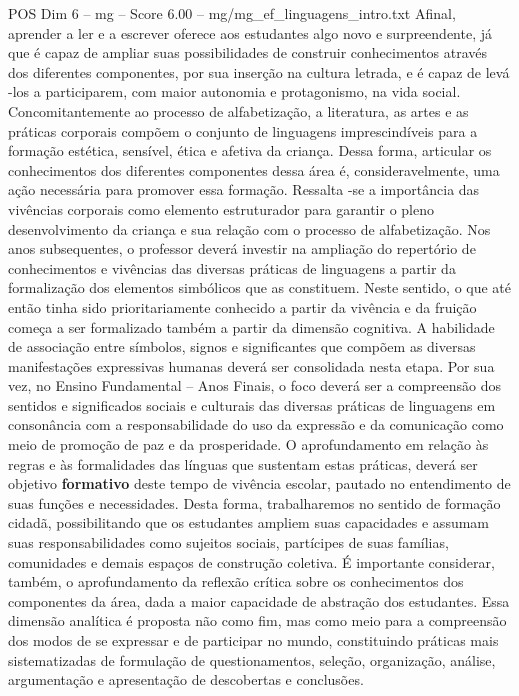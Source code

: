 \begin{textsample}{POS Dim 6 – mg – Score 6.00 – mg/mg\_ef\_linguagens\_intro.txt}
Afinal, aprender a ler e a escrever oferece aos estudantes algo novo e surpreendente, já que é capaz de ampliar suas possibilidades de construir conhecimentos através dos diferentes componentes, por sua inserção na cultura letrada, e é capaz de levá -los a participarem, com maior autonomia e protagonismo, na vida social.
Concomitantemente ao processo de alfabetização, a literatura, as artes e as práticas corporais compõem o conjunto de linguagens imprescindíveis para a formação estética, sensível, ética e afetiva da criança.
Dessa forma, articular os conhecimentos dos diferentes componentes dessa área é, consideravelmente, uma ação necessária para promover essa formação.
Ressalta -se a importância das vivências corporais como elemento estruturador para garantir o pleno desenvolvimento da criança e sua relação com o processo de alfabetização.
Nos anos subsequentes, o professor deverá investir na ampliação do repertório de conhecimentos e vivências das diversas práticas de linguagens a partir da formalização dos elementos simbólicos que as constituem.
Neste sentido, o que até então tinha sido prioritariamente conhecido a partir da vivência e da fruição começa a ser formalizado também a partir da dimensão cognitiva.
A habilidade de associação entre símbolos, signos e significantes que compõem as diversas manifestações expressivas humanas deverá ser consolidada nesta etapa.
Por sua vez, no Ensino Fundamental – Anos Finais, o foco deverá ser a compreensão dos sentidos e significados sociais e culturais das diversas práticas de linguagens em consonância com a responsabilidade do uso da expressão e da comunicação como meio de promoção de paz e da prosperidade.
O aprofundamento em relação às regras e às formalidades das línguas que sustentam estas práticas, deverá ser objetivo \textbf{formativo} deste tempo de vivência escolar, pautado no entendimento de suas funções e necessidades.
Desta forma, trabalharemos no sentido de formação cidadã, possibilitando que os estudantes ampliem suas capacidades e assumam suas responsabilidades como sujeitos sociais, partícipes de suas famílias, comunidades e demais espaços de construção coletiva.
É importante considerar, também, o aprofundamento da reflexão crítica sobre os conhecimentos dos componentes da área, dada a maior capacidade de abstração dos estudantes.
Essa dimensão analítica é proposta não como fim, mas como meio para a compreensão dos modos de se expressar e de participar no mundo, constituindo práticas mais sistematizadas de formulação de questionamentos, seleção, organização, análise, argumentação e apresentação de descobertas e conclusões.

\end{textsample}
